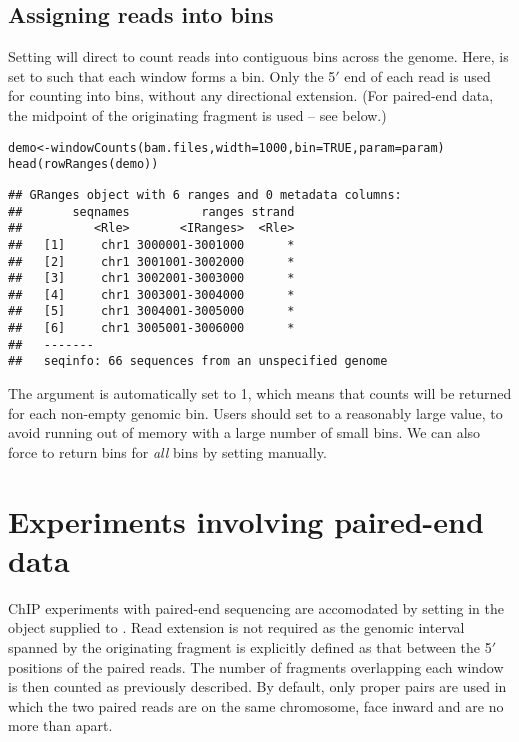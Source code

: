 \documentclass{report}\usepackage[]{graphicx}\usepackage[usenames,dvipsnames]{color}
\newcommand{\hlnum}[1]{\textcolor[rgb]{0.816,0.125,0.439}{#1}}%
\newcommand{\hlstd}[1]{\textcolor[rgb]{0.251,0.251,0.251}{#1}}%
\newcommand{\hlkwb}[1]{\textcolor[rgb]{0,0,0}{#1}}%
\newcommand{\hlkwc}[1]{\textcolor[rgb]{0.251,0.251,0.251}{#1}}%
\newcommand{\hlkwd}[1]{\textcolor[rgb]{0.878,0.439,0.125}{#1}}%
\newenvironment{knitrout}{}{} %
\begin{document}
\subsection{Assigning reads into bins}
Setting  will direct  to count reads into contiguous bins across the genome.
Here,  is set to  such that each window forms a bin.
Only the 5\ensuremath{'} end of each read is used for counting into bins, without any directional extension.
(For paired-end data, the midpoint of the originating fragment is used -- see below.)

\begin{knitrout}
\color{fgcolor}\begin{kframe}
\begin{alltt}
\hlstd{demo} \hlkwb{<-} \hlkwd{windowCounts}\hlstd{(bam.files,} \hlkwc{width}\hlstd{=}\hlnum{1000}\hlstd{,} \hlkwc{bin}\hlstd{=}\hlnum{TRUE}\hlstd{,} \hlkwc{param}\hlstd{=param)}
\hlkwd{head}\hlstd{(}\hlkwd{rowRanges}\hlstd{(demo))}
\end{alltt}
\begin{verbatim}
## GRanges object with 6 ranges and 0 metadata columns:
##       seqnames          ranges strand
##          <Rle>       <IRanges>  <Rle>
##   [1]     chr1 3000001-3001000      *
##   [2]     chr1 3001001-3002000      *
##   [3]     chr1 3002001-3003000      *
##   [4]     chr1 3003001-3004000      *
##   [5]     chr1 3004001-3005000      *
##   [6]     chr1 3005001-3006000      *
##   -------
##   seqinfo: 66 sequences from an unspecified genome
\end{verbatim}
\end{kframe}
\end{knitrout}

The  argument is automatically set to 1, which means that counts will be returned for each non-empty genomic bin.
Users should set  to a reasonably large value, to avoid running out of memory with a large number of small bins.
We can also force  to return bins for \textit{all} bins by setting  manually.

\section{Experiments involving paired-end data}
\label{data:pet}

ChIP experiments with paired-end sequencing are accomodated by setting  in the  object supplied to . 
Read extension is not required as the genomic interval spanned by the originating fragment is explicitly defined as that between the 5\ensuremath{'} positions of the paired reads.
The number of fragments overlapping each window is then counted as previously described. 
By default, only proper pairs are used in which the two paired reads are on the same chromosome, face inward and are no more than  apart.
\end{document}
